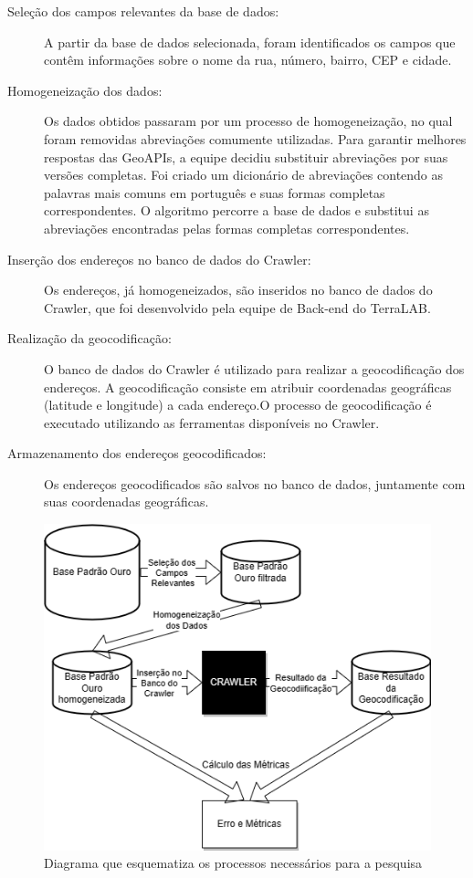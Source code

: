 \documentclass{article}
\begin{document}
\begin{description}
    \item [Seleção dos campos relevantes da base de dados:] A partir da base de dados selecionada, foram identificados os campos que contêm informações sobre o nome da rua, número, bairro, CEP e cidade.
    \item [Homogeneização dos dados:] Os dados obtidos passaram por um processo de homogeneização, no qual foram removidas abreviações comumente utilizadas. Para garantir melhores respostas das GeoAPIs, a equipe decidiu substituir abreviações por suas versões completas. Foi criado um dicionário de abreviações contendo as palavras mais comuns em português e suas formas completas correspondentes. O algoritmo percorre a base de dados e substitui as abreviações encontradas pelas formas completas correspondentes.
    \item [Inserção dos endereços no banco de dados do Crawler:] Os endereços, já homogeneizados, são inseridos no banco de dados do Crawler, que foi desenvolvido pela equipe de Back-end do TerraLAB.
    \item [Realização da geocodificação:] O banco de dados do Crawler é utilizado para realizar a geocodificação dos endereços. A geocodificação consiste em atribuir coordenadas geográficas (latitude e longitude) a cada endereço.O processo de geocodificação é executado utilizando as ferramentas disponíveis no Crawler.
    \item [Armazenamento dos endereços geocodificados:] 
    Os endereços geocodificados são salvos no banco de dados, juntamente com suas coordenadas geográficas.
\end{description}

\begin{figure}[ht]
    \centering
    \includegraphics[width=\textwidth]{diagrama monografia.drawio.png}
    \caption{Diagrama que esquematiza os processos necessários para a pesquisa}
    \label{fig:diagramaGeo}
  \end{figure}

   
 



\end{document}
